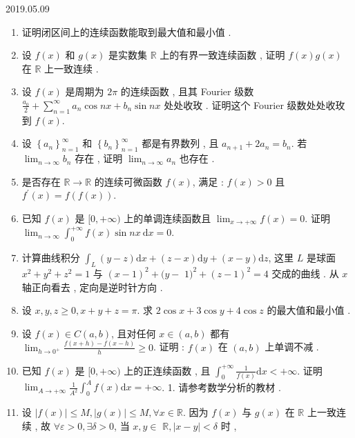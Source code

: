 \documentclass[10pt]{article}
\begin{document}
   

2019.05.09

\begin{enumerate}
  \item  证明闭区间上的连续函数能取到最大值和最小值 .

  \item  设  $f(x)$  和  $g(x)$  是实数集  $\mathbb{R}$  上的有界一致连续函数 ,  证明  $f(x) g(x)$  在  $\mathbb{R}$  上一致连续 .

  \item  设  $f(x)$  是周期为  $2 \pi$  的连续函数 ,  且其  Fourier  级数  $\frac{a_{0}}{2}+\sum_{n=1}^{\infty} a_{n} \cos n x+b_{n} \sin n x$  处处收玫 .  证明这个  Fourier  级数处处收玫到  $f(x)$.

  \item  设  $\left\{a_{n}\right\}_{n=1}^{\infty}$  和  $\left\{b_{n}\right\}_{n=1}^{\infty}$  都是有界数列 ,  且  $a_{n+1}+2 a_{n}=b_{n}$.  若  $\lim _{n \rightarrow \infty} b_{n}$  存在 ,  证明  $\lim _{n \rightarrow \infty} a_{n}$  也存在 .

  \item  是否存在  $\mathbb{R} \rightarrow \mathbb{R}$  的连续可微函数  $f(x)$,  满足 : $f(x)>0$  且  $f^{\prime}(x)=f(f(x))$.

  \item  已知  $f(x)$  是  $[0,+\infty)$  上的单调连续函数且  $\lim _{x \rightarrow+\infty} f(x)=0$.  证明  $\lim _{n \rightarrow \infty} \int_{0}^{+\infty} f(x) \sin n x \mathrm{~d} x=0$.

  \item  计算曲线积分  $\int_{L}(y-z) \mathrm{d} x+(z-x) \mathrm{d} y+(x-y) \mathrm{d} z$,  这里  $L$  是球面  $x^{2}+y^{2}+z^{2}=1$  与  $(x-1)^{2}+(y-$ $1)^{2}+(z-1)^{2}=4$  交成的曲线 .  从  $x$  轴正向看去 ,  定向是逆时针方向 .

  \item  设  $x, y, z \geqslant 0, x+y+z=\pi$.  求  $2 \cos x+3 \cos y+4 \cos z$  的最大值和最小值 .

  \item  设  $f(x) \in C(a, b)$,  且对任何  $x \in(a, b)$  都有  $\lim _{h \rightarrow 0^{+}} \frac{f(x+h)-f(x-h)}{h} \geqslant 0$.  证明 : $f(x)$  在  $(a, b)$  上单调不减 .

  \item  已知  $f(x)$  是  $[0,+\infty)$  上的正连续函数 ,  且  $\int_{0}^{+\infty} \frac{1}{f(x)} \mathrm{d} x<+\infty$.  证明  $\lim _{A \rightarrow+\infty} \frac{1}{A^{2}} \int_{0}^{A} f(x) \mathrm{d} x=+\infty$. 1.  请参考数学分析的教材 .

  \item  设  $|f(x)| \leqslant M,|g(x)| \leqslant M, \forall x \in \mathbb{R}$.  因为  $f(x)$  与  $g(x)$  在  $\mathbb{R}$  上一致连续 ,  故  $\forall \varepsilon>0, \exists \delta>0$,  当  $x, y \in$ $\mathbb{R},|x-y|<\delta$  时 ,

\end{enumerate}
\end{document}
